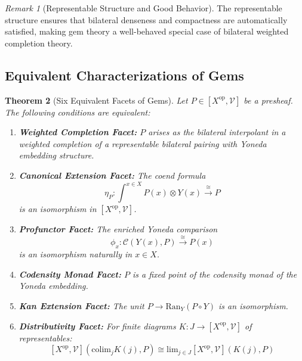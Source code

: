 \documentclass[11pt]{article}
\theoremstyle{plain}
\newtheorem{theorem}{Theorem}[section]
\theoremstyle{definition}
\theoremstyle{remark}
\newtheorem{remark}[theorem]{Remark}
\newcommand{\V}{\mathcal{V}}
\newcommand{\C}{\mathcal{C}}
\newcommand{\op}{\mathrm{op}}
\newcommand{\colim}{\mathrm{colim}}
\renewcommand{\lim}{\mathrm{lim}}
\begin{document}
\begin{remark}[Representable Structure and Good Behavior]
The representable structure ensures that bilateral denseness and compactness are automatically satisfied, making gem theory a well-behaved special case of bilateral weighted completion theory.
\end{remark}

\subsection{Equivalent Characterizations of Gems}

\begin{theorem}[Six Equivalent Facets of Gems]\label{thm:gem-equivalences}
Let $P \in [X^{\op}, \V]$ be a presheaf. The following conditions are equivalent:

\begin{enumerate}
\item \textbf{Weighted Completion Facet:} $P$ arises as the bilateral interpolant in a weighted completion of a representable bilateral pairing with Yoneda embedding structure.

\item \textbf{Canonical Extension Facet:} The coend formula
$$\eta_P : \int^{x \in X} P(x) \otimes Y(x) \xrightarrow{\cong} P$$
is an isomorphism in $[X^{\op}, \V]$.

\item \textbf{Profunctor Facet:} The enriched Yoneda comparison
$$\phi_x : \C(Y(x), P) \xrightarrow{\cong} P(x)$$
is an isomorphism naturally in $x \in X$.

\item \textbf{Codensity Monad Facet:} $P$ is a fixed point of the codensity monad of the Yoneda embedding.

\item \textbf{Kan Extension Facet:} The unit $P \to \text{Ran}_Y(P \circ Y)$ is an isomorphism.

\item \textbf{Distributivity Facet:} For finite diagrams $K : J \to [X^{\op}, \V]$ of representables:
$$[X^{\op}, \V](\colim_j K(j), P) \cong \lim_{j \in J} [X^{\op}, \V](K(j), P)$$
\end{enumerate}
\end{theorem}
\end{document}
